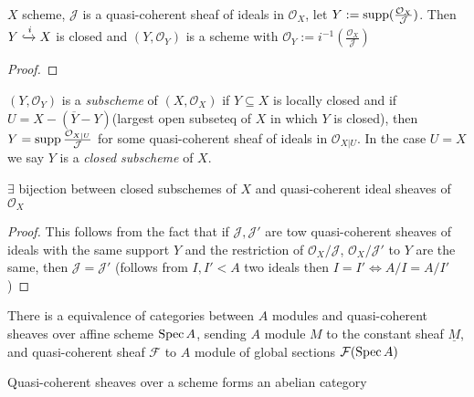 \documentclass[main]{subfiles}
\begin{document}
\begin{lemma}\label{07:02-04/28/2022}
$X$ scheme, $\mathcal J$ is a quasi-coherent sheaf of ideals in $\mathcal O_X$, let $Y:=\operatorname{supp}(\frac{\mathcal O_X}{\mathcal J})$. Then $Y\xhookrightarrow{i} X$ is closed and $(Y,\mathcal O_Y)$ is a scheme with $\mathcal O_Y:=i^{-1}(\frac{\mathcal O_X}{\mathcal J})$
\end{lemma}

\begin{proof}

\end{proof}

\begin{definition}
$(Y,\mathcal O_Y)$ is a \textit{subscheme} of $(X,\mathcal O_X)$ if $Y\subseteq X$ is locally closed and if $U=X-(\overline{Y}-Y)$(largest open subseteq of $X$ in which $Y$ is closed), then $Y=\operatorname{supp}\frac{\mathcal O_{X|U}}{\mathcal J}$ for some quasi-coherent sheaf of ideals in $\mathcal O_{X|U}$. In the case $U=X$ we say $Y$ is a \textit{closed subscheme} of $X$.
\end{definition}

\begin{proposition}
$\exists$ bijection between closed subschemes of $X$ and quasi-coherent ideal sheaves of $\mathcal O_X$
\end{proposition}

\begin{proof}
This follows from the fact that if $\mathcal J,\mathcal J'$ are tow quasi-coherent sheaves of ideals with the same support $Y$ and the restriction of $\mathcal O_X/\mathcal J$, $\mathcal O_X/\mathcal J'$ to $Y$ are the same, then $\mathcal J=\mathcal J'$ (follows from $I,I'<A$ two ideals then $I=I'\iff A/I=A/I'$)
\end{proof}

\begin{proposition}
There is a equivalence of categories between $A$ modules and quasi-coherent sheaves over affine scheme $\operatorname{Spec} A$, sending $A$ module $M$ to the constant sheaf $\underline M$, and quasi-coherent sheaf $\mathcal F$ to $A$ module of global sections $\mathcal F(\operatorname{Spec} A)$
\end{proposition}

\begin{theorem}
Quasi-coherent sheaves over a scheme forms an abelian category
\end{theorem}
\end{document}
